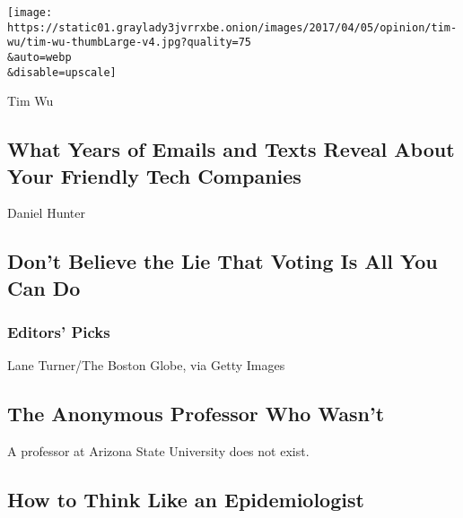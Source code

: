 \href{/2020/08/04/opinion/amazon-facebook-congressional-hearings.html}{}

\texttt{[image: https://static01.graylady3jvrrxbe.onion/images/2017/04/05/opinion/tim-wu/tim-wu-thumbLarge-v4.jpg?quality=75\\\&auto=webp\\\&disable=upscale]}

Tim Wu

\hypertarget{what-years-of-emails-and-texts-reveal-about-your-friendly-tech-companies}{%
\subsection{What Years of Emails and Texts Reveal About Your Friendly
Tech
Companies}\label{what-years-of-emails-and-texts-reveal-about-your-friendly-tech-companies}}

\href{/2020/08/04/opinion/voting-2020-election-blm-movement.html}{}

Daniel Hunter

\hypertarget{dont-believe-the-lie-that-voting-is-all-you-can-do}{%
\subsection{Don't Believe the Lie That Voting Is All You Can
Do}\label{dont-believe-the-lie-that-voting-is-all-you-can-do}}

\hypertarget{editors-picks}{%
\subsubsection{Editors' Picks}\label{editors-picks}}

\href{/2020/08/04/style/college-coronavirus-hoax.html}{}

Lane Turner/The Boston Globe, via Getty Images

\href{/2020/08/04/style/college-coronavirus-hoax.html}{}

\hypertarget{the-anonymous-professor-who-wasnt}{%
\subsection{The Anonymous Professor Who
Wasn't}\label{the-anonymous-professor-who-wasnt}}

A professor at Arizona State University does not exist.

\href{/2020/08/04/science/coronavirus-bayes-statistics-math.html}{}

\hypertarget{how-to-think-like-an-epidemiologist}{%
\subsection{How to Think Like an
Epidemiologist}\label{how-to-think-like-an-epidemiologist}}

